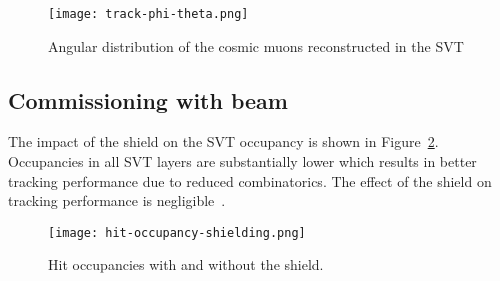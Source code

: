 \begin{figure}[hbt] 
\centering 
\texttt{[image: track-phi-theta.png]}
\caption{Angular distribution of the cosmic muons reconstructed in the SVT}
\label{fig:track-phi-theta}
\end{figure}

\subsection{Commissioning with beam}

The impact of the shield on the SVT occupancy is shown in Figure~\ref{fig:hit-occupancy-shielding}. Occupancies in all SVT layers are substantially lower which results in better tracking performance due to reduced combinatorics. The effect of the shield on tracking performance is negligible~\cite{SHIELDNOTE}.

\begin{figure}[hbt] 
\centering 
\texttt{[image: hit-occupancy-shielding.png]}
\caption{Hit occupancies with and without the shield.}
\label{fig:hit-occupancy-shielding}
\end{figure}

